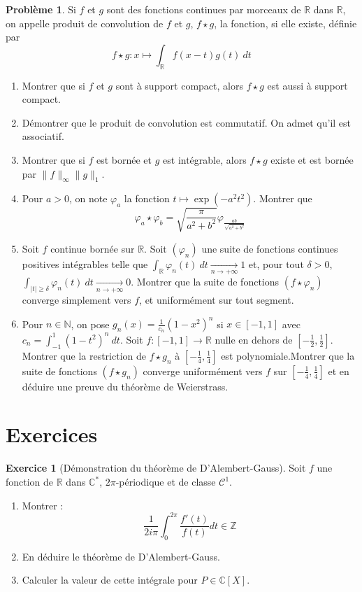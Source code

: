 \documentclass[french]{book}
\newcommand{\N}{\mathbb{N}}
\newcommand{\Z}{\mathbb{Z}}
\newcommand{\R}{\mathbb{R}}
\newcommand{\C}{\mathbb{C}}
\newcommand{\st}{^*}
\theoremstyle{definition}
\newtheorem{ex}{Exercice}[chapter]
\newtheorem{pro}{Problème}[chapter]
\begin{document}
\begin{pro}
	Si $f$ et $g$ sont des fonctions continues par morceaux de $\R$ dans $\R$, on appelle produit de convolution de $f$ et $g$, $f\star g$, la fonction, si elle existe, définie par $$f\star g:x\mapsto\displaystyle\int_\R f(x-t)g(t)\ dt$$
	\begin{enumerate}
		\item Montrer que si $f$ et $g$ sont à support compact, alors $f\star g$ est aussi à support compact.
		\item Démontrer que le produit de convolution est commutatif. On admet qu'il est associatif.
		\item Montrer que si $f$ est bornée et $g$ est intégrable, alors $f\star g$ existe et est bornée par $\lVert f\rVert_\infty\lVert g\rVert_1$.
		\item Pour $a>0$, on note $\varphi_a$ la fonction $t\mapsto\exp(-a^2t^2)$. Montrer que $$\varphi_a\star\varphi_b=\sqrt{\frac{\pi}{a^2+b^2}}\varphi_{\frac{ab}{\sqrt{a^2+b^2}}}$$
		\item Soit $f$ continue bornée sur $\R$. Soit $(\varphi_n)$ une suite de fonctions continues positives intégrables telle que $\displaystyle\int_\R\varphi_n(t)\ dt\xrightarrow[n\to+\infty]{}1$ et, pour tout $\delta>0$, $\displaystyle\int_{\lvert t\rvert\geqslant \delta}\varphi_n(t)\ dt\xrightarrow[n\to+\infty]{}0$. Montrer que la suite de fonctions $(f\star\varphi_n)$ converge simplement vers $f$, et uniformément sur tout segment.
		\item Pour $n\in\N$, on pose $\displaystyle g_n(x)=\frac{1}{c_n}(1-x^2)^n$ si $x\in[-1,1]$ avec $c_n=\displaystyle\int_{-1}^{1}(1-t^2)^n\ dt$. Soit $f:[-1,1]\to\R$ nulle en dehors de $\displaystyle\left[-\frac{1}{2},\frac{1}{2}\right]$. Montrer que la restriction de $f\star g_n$ à $\displaystyle\left[-\frac{1}{4},\frac{1}{4}\right]$ est polynomiale.Montrer que la suite de fonctions $(f\star g_n)$ converge uniformément vers $f$ sur $\displaystyle\left[-\frac{1}{4},\frac{1}{4}\right]$ et en déduire une preuve du théorème de Weierstrass.
	\end{enumerate}
\end{pro}

\section{Exercices}

\begin{ex}[Démonstration du théorème de D'Alembert-Gauss]
	Soit $f$ une fonction de $\R$ dans $\C\st$, $2\pi$-périodique et de classe $\mathcal{C}^1$.
	\begin{enumerate}
		\item Montrer : $$\frac{1}{2i\pi}\int_{0}^{2\pi}\frac{f'(t)}{f(t)}dt\in\Z$$
		\item En déduire le théorème de D'Alembert-Gauss.
		\item Calculer la valeur de cette intégrale pour $P\in\C[X]$.
	\end{enumerate}
\end{ex}
\end{document}
